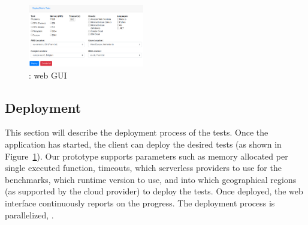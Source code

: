 \begin{figure}[!t]
\begin{center}
\includegraphics[width=0.45\textwidth]{bilder/ui.png}
\captionsetup{justification=centering, labelfont=bf}
\caption{\sys: web GUI}
\label{fig:ui}
\end{center}
\end{figure}

\subsection{Deployment}
This section will describe the deployment process of the tests.
Once the application has started, the client can deploy the desired tests (as shown in Figure~\ref{fig:ui}).
Our prototype supports parameters such as memory allocated per single executed function, timeouts, which serverless providers to use for the benchmarks, which runtime version to use, and into which geographical regions (as supported by the cloud provider) to deploy the tests. 
Once deployed, the web interface continuously reports on the progress. 
The deployment process is parallelized, .

